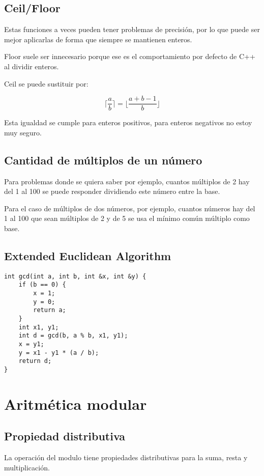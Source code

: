 \documentclass[10pt]{article}
\begin{document}
\subsection{Ceil/Floor}

Estas funciones a veces pueden tener problemas de precisión, por lo que puede ser mejor aplicarlas de forma que siempre se mantienen enteros.

Floor suele ser innecesario porque ese es el comportamiento por defecto de C++ al dividir enteros.

Ceil se puede sustituir por:

\[ \lceil \frac{a}{b} \rceil = \lfloor \frac{a + b - 1}{b} \rfloor \]

Esta igualdad se cumple para enteros positivos, para enteros negativos no estoy muy seguro.

\subsection{Cantidad de múltiplos de un número}

Para problemas donde se quiera saber por ejemplo, cuantos múltiplos de 2 hay del 1 al 100 se puede responder dividiendo este número entre la base.

Para el caso de múltiplos de dos números, por ejemplo, cuantos números hay del 1 al 100 que sean múltiplos de 2 y de 5 se usa el mínimo común múltiplo como base.

\subsection{Extended Euclidean Algorithm}

\begin{lstlisting}
int gcd(int a, int b, int &x, int &y) {
    if (b == 0) {
        x = 1;
        y = 0;
        return a;
    }
    int x1, y1;
    int d = gcd(b, a % b, x1, y1);
    x = y1;
    y = x1 - y1 * (a / b);
    return d;
}
\end{lstlisting}

\section{Aritmética modular}

\subsection{Propiedad distributiva}

La operación del modulo tiene propiedades distributivas para la suma, resta y multiplicación.
\end{document}
